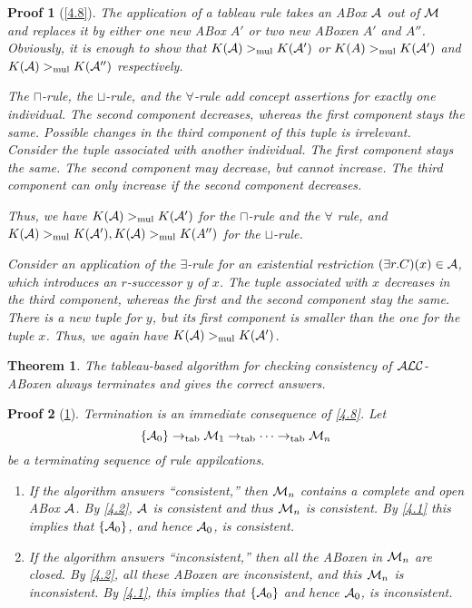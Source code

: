 \documentclass[openany]{scrbook}
\theoremstyle{break}
\newtheorem{Theorem}{Theorem}[chapter]
\theoremstyle{nonumberbreak}
\theoremstyle{nonumberplain}
\theoremstyle{nonumberbreak}
\newtheorem{Proof}{Proof}
\newcommand{\set}[1]{\left\{#1\right\}}
\newcommand{\ALC}{{\cal A}{\cal L}{\cal C}}
\newcommand{\totab}{\to_{\operatorname{tab}}}
\newcommand{\gtmul}{>_{\operatorname{mul}}}
\begin{document}
\begin{Proof}[\cref{4.8}]
  The application of a tableau rule takes an ABox ${\cal A}$ out of
  ${\cal M}$ and replaces it by either one new ABox $A'$ or two new
  ABoxen $A'$ and $A''$. Obviously, it is enough to show that $K({\cal
    A}) \gtmul K({\cal A}')$ or $K(A) \gtmul K({\cal A}')$ and
  $K({\cal A}) \gtmul K({\cal A}'')$ respectively.

  The $\sqcap$-rule, the $\sqcup$-rule, and the $\forall$-rule add
  concept assertions for exactly one individual. The second component
  decreases, whereas the first component stays the same. Possible
  changes in the third component of this tuple is irrelevant. Consider
  the tuple associated with another individual. The first component
  stays the same. The second component may decrease, but cannot
  increase. The third component can only increase if the second
  component decreases.

  Thus, we have $K({\cal A}) \gtmul K({\cal A}')$ for the
  $\sqcap$-rule and the $\forall$ rule, and $K({\cal A}) \gtmul
  K({\cal A}'), K({\cal A}) \gtmul K(A'')$ for the $\sqcup$-rule.

  Consider an application of the $\exists$-rule for an existential
  restriction $(\exists r.C)(x) \in {\cal A}$, which introduces an
  $r$-successor $y$ of $x$. The tuple associated with $x$ decreases in
  the third component, whereas the first and the second component stay
  the same. There is a new tuple for $y$, but its first component is
  smaller than the one for the tuple $x$. Thus, we again have $K({\cal
    A}) \gtmul K({\cal A}')$.
\end{Proof}

\begin{Theorem}
  \label{4.9}
  The tableau-based algorithm for checking consistency of
  $\ALC$-ABoxen always terminates and gives the correct answers.
\end{Theorem}

\begin{Proof}[\cref{4.9}]
  Termination is an immediate consequence of \cref{4.8}.
  Let
  \begin{equation*}
    \set{{\cal A}_0} \totab {\cal M}_1 \totab \dotsb \totab {\cal M}_n
  \end{equation*}
  be a terminating sequence of rule appilcations.
  \begin{enumerate}
  \item If the algorithm answers ``consistent,'' then ${\cal M}_n$
    contains a complete and open ABox ${\cal A}$. By \cref{4.2},
    ${\cal A}$ is consistent and thus ${\cal M}_n$ is consistent. By
    \cref{4.1} this implies that $\set{{\cal A}_0}$, and hence ${\cal
      A}_0$, is consistent.
  \item If the algorithm answers ``inconsistent,'' then all the ABoxen
    in ${\cal M}_n$ are closed. By \cref{4.2}, all these ABoxen are
    inconsistent, and this ${\cal M}_n$ is inconsistent. By
    \cref{4.1}, this implies that $\set{{\cal A}_0}$ and hence ${\cal
      A}_0$, is inconsistent.
  \end{enumerate}
\end{Proof}
\end{document}
